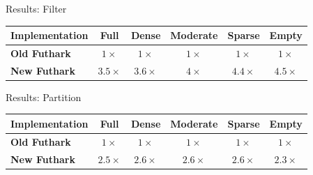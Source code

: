 \documentclass[aspectratio=169]{beamer}
\begin{document}
\begin{frame}{Results: Filter}
\begin{center}
{\Large
\begin{tabular}{l|c|c|c|c|c}
  \textbf{Implementation} & \textbf{Full} & \textbf{Dense} & \textbf{Moderate} &
  \textbf{Sparse} & \textbf{Empty} \\
  \hline
  \textbf{Old Futhark} & $1\times$ & $1\times$ & $1\times$ & $1\times$ & $1\times$ \\
  \textbf{New Futhark} & $3.5\times$ & $3.6\times$ & $4\times$ & $4.4\times$ & $4.5\times$
\end{tabular}
\vspace{20pt}

}
\end{center}
\end{frame}

\begin{frame}{Results: Partition}
\begin{center}
{\Large
\begin{tabular}{l|c|c|c|c|c}
  \textbf{Implementation} & \textbf{Full} & \textbf{Dense} & \textbf{Moderate} &
  \textbf{Sparse} & \textbf{Empty} \\
  \hline
  \textbf{Old Futhark} & $1 \times$ & $1\times$ & $1\times$ & $1\times$ & $1\times$ \\
  \textbf{New Futhark} & $2.5\times$ & $2.6\times$ & $2.6\times$ & $2.6\times$ & $2.3\times$
\end{tabular}

\vspace{20pt}

}
\end{center}
\end{frame}
\end{document}
